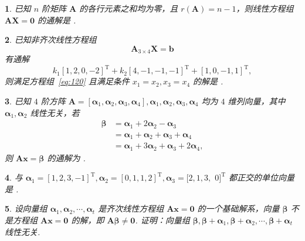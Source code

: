 \documentclass[openany,twocolumn]{ctexbook}
\numberwithin{figure}{section}
\theoremstyle{change}
\theoremstyle{change}
\newtheorem{titwo}{}
\def\htwo{ \uline{\hspace{\fill}}}
\def\TT{\mathrm{T}}
\begin{document}
	\begin{titwo}
		已知 $n$ 阶矩阵 $\bm A$ 的各行元素之和均为零，且 $r(\bm A) = n - 1$，则线性方程组 $\bm A \bm X = \bm 0$ 的通解是\htwo.
	\end{titwo}

	\begin{titwo}
		已知非齐次线性方程组
		\begin{equation}\label{eq:120}
			\bm A_{3 \times 4} \bm X = \bm b
		\end{equation}
		有通解
		\[
			k_{1} [1,2,0,-2]^{\TT} + k_{2} [4,-1,-1,-1]^{\TT} + [1,0,-1,1]^{\TT},
		\]
		则满足方程组~\eqref{eq:120} 且满足条件 $x_{1} = x_{2},x_{3} = x_{4}$ 的解是\htwo.
	\end{titwo}

	\begin{titwo}
		已知 $4$ 阶方阵 $\bm A = [\bm \alpha_{1},\bm \alpha_{2},\bm \alpha_{3},\bm \alpha_{4}],\bm \alpha_{1},\bm \alpha_{2},\bm \alpha_{3},\bm \alpha_{4}$ 均为 $4$ 维列向量，其中 $\bm \alpha_{1},\bm \alpha_{2}$ 线性无关，若
		\begin{align*}
			\bm \beta &= \bm \alpha_{1} + 2 \bm \alpha_{2} - \bm \alpha_{3} \\
			&= \bm \alpha_{1} + \bm \alpha_{2} + \bm \alpha_{3} + \bm \alpha_{4} \\
			&= \bm \alpha_{1} + 3 \bm \alpha_{2} + \bm \alpha_{3} + 2 \bm \alpha_{4},
		\end{align*}
		则 $\bm A \bm x = \bm \beta$ 的通解为\htwo.
	\end{titwo}

	\begin{titwo}
		与 $\bm \alpha_{1} = [1,2,3,-1]^{\TT}, \bm \alpha_{2} = [0,1,1,2]^{\TT}, \bm \alpha_{3} = [2,1,3,$ $0]^{\TT}$ 都正交的单位向量是\htwo.
	\end{titwo}

	\begin{titwo}
		设向量组 $\bm \alpha_{1},\bm \alpha_{2},\cdots,\bm \alpha_{t}$ 是齐次线性方程组 $\bm A \bm x = \bm 0$ 的一个基础解系，向量 $\bm \beta$ 不是方程组 $\bm A \bm x = \bm 0$ 的解，即 $\bm A \bm \beta \ne \bm 0$. 证明：向量组 $\bm \beta,\bm \beta + \bm \alpha_{1},\bm \beta + \bm \alpha_{2},\cdots,\bm \beta + \bm \alpha_{t}$ 线性无关. 
	\end{titwo}
\end{document}
